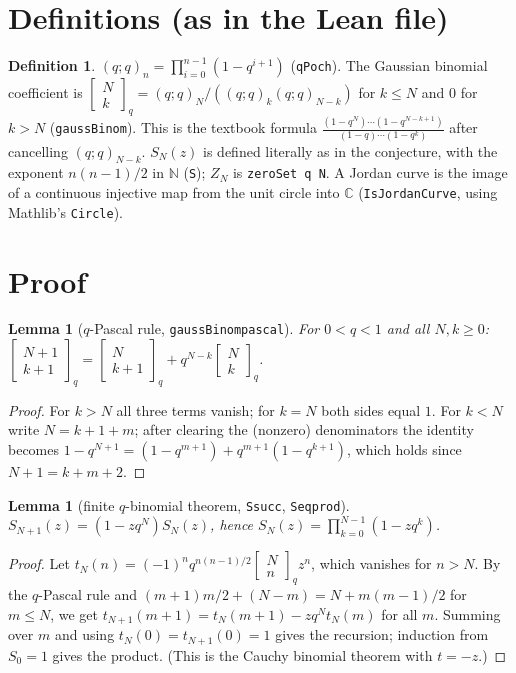 \documentclass[11pt]{article}
\renewcommand{\_}{\oldus\allowbreak}
\newtheorem{lemma}[theorem]{Lemma}
\theoremstyle{definition}
\newtheorem{definition}[theorem]{Definition}
\theoremstyle{remark}
\newcommand{\qbin}[3]{\begin{bmatrix}#1\\#2\end{bmatrix}_{#3}}
\begin{document}
\section{Definitions (as in the Lean file)}

\begin{definition}
$(q;q)_n=\prod_{i=0}^{n-1}(1-q^{i+1})$ (\texttt{qPoch}). The Gaussian binomial coefficient is
$\qbin{N}{k}{q}=(q;q)_N/((q;q)_k(q;q)_{N-k})$ for $k\le N$ and $0$ for $k>N$ (\texttt{gaussBinom}).
This is the textbook formula
$\frac{(1-q^N)\cdots(1-q^{N-k+1})}{(1-q)\cdots(1-q^k)}$ after cancelling $(q;q)_{N-k}$.
$S_N(z)$ is defined literally as in the conjecture, with the exponent $n(n-1)/2$ in $\mathbb{N}$
(\texttt{S}); $Z_N$ is \texttt{zeroSet q N}.
A Jordan curve is the image of a continuous injective map from the unit circle into $\mathbb{C}$
(\texttt{IsJordanCurve}, using Mathlib's \texttt{Circle}).
\end{definition}

\section{Proof}

\begin{lemma}[$q$-Pascal rule, \texttt{gaussBinom\_pascal}]
For $0<q<1$ and all $N,k\ge0$:
$\qbin{N+1}{k+1}{q}=\qbin{N}{k+1}{q}+q^{N-k}\qbin{N}{k}{q}$.
\end{lemma}
\begin{proof}
For $k>N$ all three terms vanish; for $k=N$ both sides equal $1$. For $k<N$ write $N=k+1+m$; after
clearing the (nonzero) denominators the identity becomes
$1-q^{N+1}=(1-q^{m+1})+q^{m+1}(1-q^{k+1})$, which holds since $N+1=k+m+2$.
\end{proof}

\begin{lemma}[finite $q$-binomial theorem, \texttt{S\_succ}, \texttt{S\_eq\_prod}]
$S_{N+1}(z)=(1-zq^N)S_N(z)$, hence $S_N(z)=\prod_{k=0}^{N-1}(1-zq^k)$.
\end{lemma}
\begin{proof}
Let $t_N(n)=(-1)^nq^{n(n-1)/2}\qbin{N}{n}{q}z^n$, which vanishes for $n>N$. By the $q$-Pascal rule and
$(m+1)m/2+(N-m)=N+m(m-1)/2$ for $m\le N$, we get $t_{N+1}(m+1)=t_N(m+1)-zq^Nt_N(m)$ for all $m$.
Summing over $m$ and using $t_N(0)=t_{N+1}(0)=1$ gives the recursion; induction from $S_0=1$ gives
the product. (This is the Cauchy binomial theorem with $t=-z$.)
\end{proof}
\end{document}
